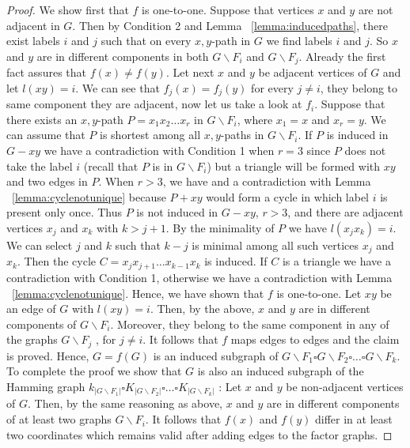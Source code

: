 \documentclass[12pt,a4paper,titlepage,openany]{report}
\begin{document}
\begin{proof}
We show first that $f$ is one-to-one. Suppose that vertices $x$ and $y$ are not adjacent in $G$. Then by Condition 2 and Lemma ~\ref{lemma:inducedpaths}, there exist labels $i$ and $j$ such that on every $x, y$-path in $G$ we find labels $i$ and $j$. So $x$ and $y$ are in different components in both $G\backslash F_i$ and $G\backslash F_j$. Already the first fact assures that $f(x)\neq f(y)$. Let next $x$ and $y$ be adjacent vertices of $G$ and let $l(xy)=i$. We can see that $f_j(x)=f_j(y)$ for every $j\neq i$, they belong to same component they are adjacent, now let us take a look at $f_i$. Suppose that there exists an $x, y$-path $P=x_1x_2\ldots x_r$ in $G\backslash F_i$, where $x_1=x$ and $x_r=y$. We can assume that $P$ is shortest among all $x, y$-paths in $G\backslash F_i$. If $P$ is induced in $G-xy$ we have a contradiction with Condition 1 when $r=3$ since $P$ does not take the label $i$ (recall that $P$ is in $G\backslash F_i$) but a triangle will be formed with $xy$ and two edges in $P$. When $r>3$, we have and a contradiction with Lemma ~\ref{lemma:cyclenotunique} because $P+xy$ would form a cycle in which label $i$  is present only once. Thus $P$ is not induced in $G-xy$,
$r > 3$, and there are adjacent vertices $x_j$ and $x_k$ with $k > j+1$. By the minimality of $P$ we have $l(x_jx_k)=i$. We can select $j$ and $k$ such that $k- j$ is minimal among all such vertices $x_j$ and $x_k$. Then the cycle $C=x_jx_{j+1}\ldots x_{k-1}x_k$ is induced. If $C$ is a triangle we have a contradiction with Condition 1, otherwise we have a
contradiction with Lemma ~\ref{lemma:cyclenotunique}. Hence, we have shown that $f$ is one-to-one.\newline
Let $xy$ be an edge of $G$ with $l(xy)=i$. Then, by the above, $x$ and $y$ are in different components of $G\backslash F_i$. Moreover, they belong to the same component in any of the graphs $G\backslash F_j$ , for $j\neq i$. It follows that $f$ maps edges to edges and the claim is proved.\newline
Hence, $G=f(G)$ is an induced subgraph of $G\backslash F_1\square G\backslash F_2\square \ldots \square G\backslash F_k$. To complete the proof we show that $G$ is also an induced subgraph of the Hamming graph $k_{|G\backslash F_1|}\square K_{|G\backslash F_2|}\square \ldots \square K_{|G\backslash F_k|}$ :
Let $x$ and $y$ be non-adjacent vertices of $G$. Then, by the same reasoning as above, $x$ and $y$ are in different components of at least two graphs $G\backslash F_i$. It follows that $f(x)$ and $f(y)$ differ in at least two coordinates which remains valid after adding edges to the factor graphs.
\end{proof}
\end{document}
